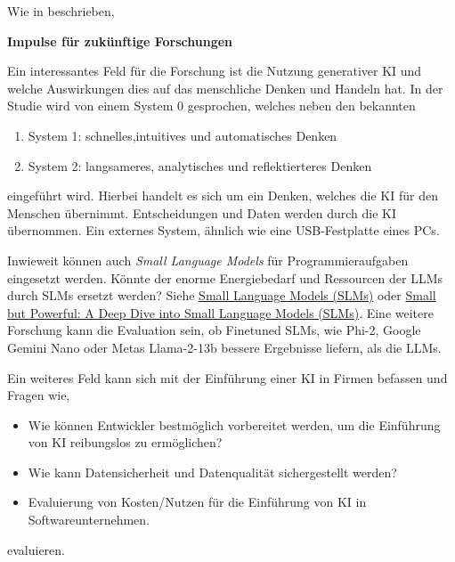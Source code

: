 

Wie in \cite{hartenstein_2024} beschrieben,

\textbf{Impulse für zukünftige Forschungen}\vspace{0.2cm}

Ein interessantes Feld für die Forschung ist die Nutzung generativer KI und welche Auswirkungen dies auf das menschliche Denken und Handeln hat. In der Studie \cite{chiriatti-2024} wird von einem System 0 gesprochen, welches neben den bekannten 
\begin{enumerate}
	\item System 1: schnelles,intuitives und automatisches Denken
	\item System 2: langsameres, analytisches und reflektierteres Denken
\end{enumerate}

eingeführt wird. Hierbei handelt es sich um ein Denken, welches die KI für den Menschen übernimmt. Entscheidungen und Daten werden durch die KI übernommen. Ein externes System, ähnlich wie eine USB-Festplatte eines PCs.\vspace{0.2cm}

Inwieweit können auch \textit{Small Language Models} für Programmieraufgaben eingesetzt werden. Könnte der enorme Energiebedarf und Ressourcen der LLMs durch SLMs ersetzt werden? Siehe 
\href{https://medium.com/@nageshmashette32/small-language-models-slms-305597c9edf2}{Small Language Models (SLMs)} oder \href{https://medium.com/version-1/small-but-powerful-a-deep-dive-into-small-language-models-slms-b793bdb002f2}{Small but Powerful: A Deep Dive into Small Language Models (SLMs)}. Eine weitere Forschung kann die Evaluation sein, ob Finetuned SLMs, wie Phi-2, Google Gemini Nano oder Metas Llama-2-13b bessere Ergebnisse liefern, als die LLMs.\vspace{0.2cm}

Ein weiteres Feld kann sich mit der Einführung einer KI in Firmen befassen und Fragen wie,

\begin{itemize}
	\item Wie können Entwickler bestmöglich vorbereitet werden, um die Einführung von KI reibungslos zu ermöglichen?
	\item Wie kann Datensicherheit und Datenqualität sichergestellt werden?
	\item Evaluierung von Kosten/Nutzen für die Einführung von KI in Softwareunternehmen.
\end{itemize}

evaluieren.